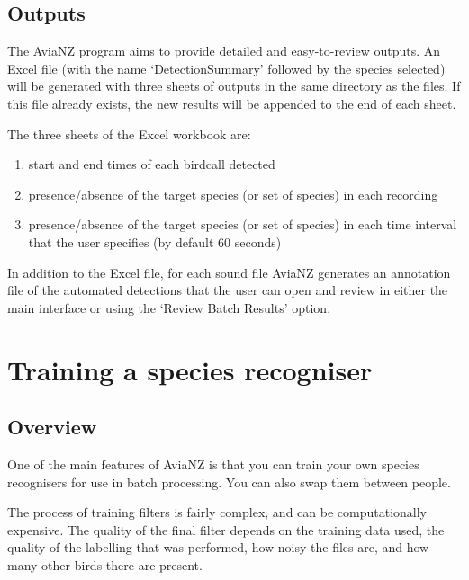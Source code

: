 \documentclass{article}
\begin{document}
\subsection{Outputs}
\label{sec:outputs}

The AviaNZ program aims to provide detailed and easy-to-review outputs. An Excel file (with the name `DetectionSummary' followed by the species selected) will be generated with three sheets of outputs in the same directory as the files. If this file already exists, the new results will be appended to the end of each sheet. 

The three sheets of the Excel workbook are:
\begin{enumerate}
\item start and end times of each birdcall detected
\item presence/absence of the target species (or set of species) in each recording
\item  presence/absence of the target species (or set of species) in each time interval that the user specifies (by default 60 seconds)
\end{enumerate}

In addition to the Excel file, for each sound file AviaNZ generates an annotation file of the automated detections that  the user can open and review in either the main interface or using the `Review Batch Results' option. 

\newpage
\section{Training a species recogniser}\label{sec:trainfilter}

\subsection{Overview}

One of the main features of AviaNZ is that you can train your own species recognisers for use in batch processing. You can also swap them between people.%

The process of training filters is fairly complex, and can be computationally expensive. The quality of the final filter depends on the training data used, the quality of the labelling that was performed, how noisy the files are, and how many other birds there are present.
\end{document}
